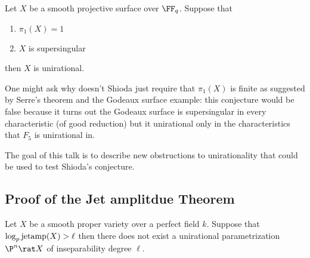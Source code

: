 \documentclass[12pt]{article}
\begin{document}
\begin{conj}[Shioda]
Let $X$ be a smooth projective surface over $\FF_q$. Suppose that
\begin{enumerate}
\item $\pi_1(X) = 1$
\item $X$ is supersingular
\end{enumerate}
then $X$ is unirational.
\end{conj}

\begin{rmk}
One might ask why doesn't Shioda just require that $\pi_1(X)$ is finite as suggested by Serre's theorem and the Godeaux surface example: this conjecture would be false because it turns out the Godeaux surface is supersingular in every characteristic (of good reduction) but it unirational only in the characteristics that $F_5$ is unirational in.
\end{rmk}

The goal of this talk is to describe new obstructions to unirationality that could be used to test Shioda's conjecture.

\subsection{Proof of the Jet amplitdue Theorem}

\begin{theorem}[C]
Let $X$ be a smooth proper variety over a perfect field $k$. Suppose that $\log_p \mathrm{jetamp}(X) > \ell$ then there does not exist a unirational parametrization $\P^n \rat X$ of inseparability degree $\ell$.
\end{theorem}
\end{document}
